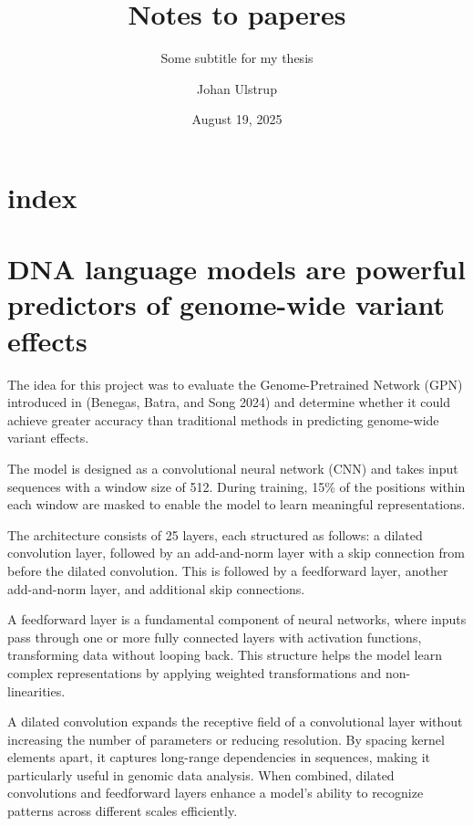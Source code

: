 \documentclass[
  a4paper,
  openany]{scrbook}
\title{Notes to paperes}
\subtitle{Some subtitle for my thesis}
\author{Johan Ulstrup}
\date{August 19, 2025}
\renewcommand*\contentsname{Table of contents}
\newcommand\contentsname{Table of contents}
\begin{document}
\frontmatter
\maketitle

\renewcommand*\contentsname{Table of contents}
{
\setcounter{tocdepth}{1}
\tableofcontents
}

\mainmatter
\chapter{index}\label{index}

\chapter{DNA language models are powerful predictors of genome-wide
variant
effects}\label{dna-language-models-are-powerful-predictors-of-genome-wide-variant-effects}

The idea for this project was to evaluate the Genome-Pretrained Network
(GPN) introduced in (Benegas, Batra, and Song 2024) and determine
whether it could achieve greater accuracy than traditional methods in
predicting genome-wide variant effects.

The model is designed as a convolutional neural network (CNN) and takes
input sequences with a window size of 512. During training, 15\% of the
positions within each window are masked to enable the model to learn
meaningful representations.

The architecture consists of 25 layers, each structured as follows: a
dilated convolution layer, followed by an add-and-norm layer with a skip
connection from before the dilated convolution. This is followed by a
feedforward layer, another add-and-norm layer, and additional skip
connections.

A feedforward layer is a fundamental component of neural networks, where
inputs pass through one or more fully connected layers with activation
functions, transforming data without looping back. This structure helps
the model learn complex representations by applying weighted
transformations and non-linearities.

A dilated convolution expands the receptive field of a convolutional
layer without increasing the number of parameters or reducing
resolution. By spacing kernel elements apart, it captures long-range
dependencies in sequences, making it particularly useful in genomic data
analysis. When combined, dilated convolutions and feedforward layers
enhance a model's ability to recognize patterns across different scales
efficiently.
\end{document}
